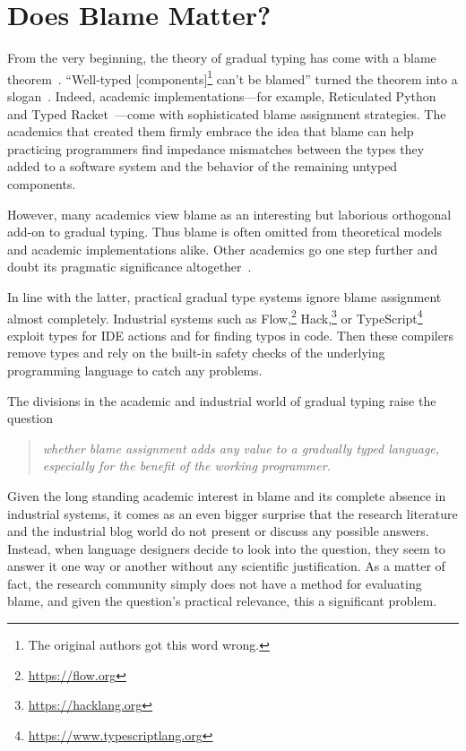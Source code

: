 \section{Does Blame Matter?} \label{sec:introduction}

From the very beginning, the theory of gradual typing has come with a
blame theorem~\cite{mf-toplas-2009, tf-dls-2006}. ``Well-typed
[components]\footnote{The original authors got this word wrong.} can't be
blamed'' turned the theorem into a slogan~\cite{wf-esop-2009}. Indeed,
academic implementations---for example, Reticulated
Python~\cite{vsc-dls-2019, vss-popl-2017, vksb-dls-2014} and Typed
Racket~\cite{tf-dls-2006,tf-popl-2008,tfffgksst-snapl-2017,tf-icfp-2010}---come
with sophisticated blame assignment strategies. The academics that
created them firmly embrace the idea that blame can help practicing
programmers find impedance mismatches between the types they added to a
software system and the behavior of the remaining untyped components.

However, many academics view blame as an interesting but laborious
orthogonal add-on to 
gradual typing. Thus blame is often omitted from theoretical models and
academic implementations alike.
Other academics go one step further and doubt its pragmatic significance altogether~\cite{cc-snapl-19}.

In line with the latter, practical gradual type systems ignore blame assignment almost completely.
Industrial systems such as Flow,\footnote{\url{https://flow.org}}
Hack,\footnote{\url{https://hacklang.org}} or
TypeScript\footnote{\url{https://www.typescriptlang.org}} exploit types for IDE actions and for finding typos in
code. Then these compilers remove types and rely on the built-in safety checks of
the underlying programming language to catch any problems.

The divisions in the academic and industrial world of gradual typing raise the question 
\begin{quote}
 \it
 whether blame assignment adds any value to a gradually typed language, \\
 especially for the benefit of the working programmer.
\end{quote}
Given the long standing academic interest in blame  and its complete absence in
industrial systems, it comes as an even bigger surprise that the research
literature and the industrial blog world do not present or discuss any
possible answers.  Instead, when language designers decide to look into the
question, they seem to answer it one way or another without any scientific
justification. As a matter of fact, the research community simply does not have a
method for evaluating blame, and given the question's practical
relevance, this a significant problem.

